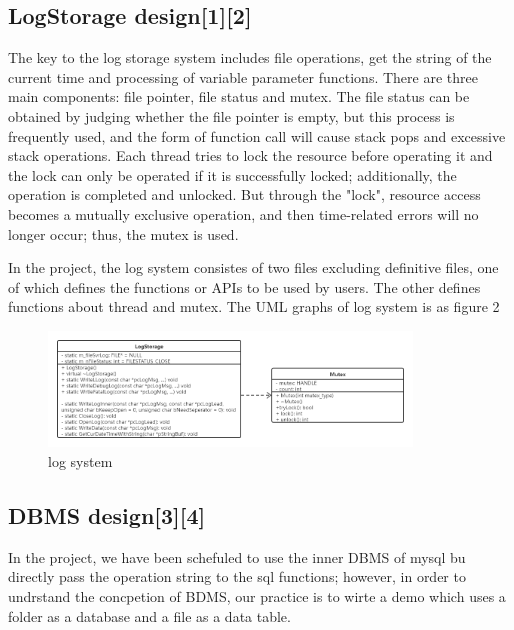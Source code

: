 \documentclass[UTF8, 11pt, twocolumn]{ctexart}
\begin{document}
        \subsection{LogStorage design[1][2]}
            The key to the log storage system includes file operations, get the string of the current time and processing of variable parameter functions. 
            There are three main components: file pointer, file status and mutex. The file status can be obtained by judging whether the file pointer is empty, 
            but this process is frequently used, and the form of function call will cause stack pops and excessive stack operations.  
            Each thread tries to lock the resource before operating it and the lock can only be operated if it is successfully locked; additionally, the 
            operation is completed and unlocked. But through the "lock", resource access becomes a mutually exclusive operation, and then time-related errors 
            will no longer occur; thus, the mutex is used. \par
            In the project, the log system consistes of two files excluding definitive files, one of which defines the functions or APIs to be used by users. 
            The other defines functions about thread and mutex. The UML graphs of log system is as figure 2
            \begin{figure}[htbp]
                \centering
                \includegraphics[width=9.67cm,height=3.08cm]{LogStorage.png}
                \caption{log system}                    
                \end{figure} 
        \subsection{DBMS design[3][4]}
            In the project, we have been schefuled to use the inner DBMS of mysql bu directly pass the operation string to the sql functions; however, in order 
            to undrstand the concpetion of BDMS, our practice is to wirte a demo which uses a folder as a database and a file as a data table.
\end{document}
